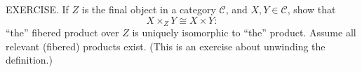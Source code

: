 EXERCISE. If $Z$ is the final object in a category $\mathcal{C}$, and $X,Y\in\mathcal{C}$, show that
$$X\times_ZY\cong X\times Y:$$
“the” fibered product over $Z$ is uniquely isomorphic to “the” product. Assume all relevant (fibered) products exist. (This is an exercise about unwinding the definition.)
